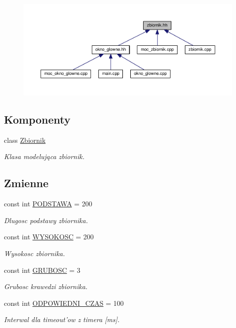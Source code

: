 \nopagebreak
\begin{figure}[H]
\begin{center}
\leavevmode
\includegraphics[width=350pt]{zbiornik_8hh__dep__incl}
\end{center}
\end{figure}
\subsection*{Komponenty}
\begin{DoxyCompactItemize}
\item 
class \hyperlink{class_zbiornik}{Zbiornik}
\begin{DoxyCompactList}\small\item\em Klasa modelująca zbiornik. \end{DoxyCompactList}\end{DoxyCompactItemize}
\subsection*{Zmienne}
\begin{DoxyCompactItemize}
\item 
const int \hyperlink{zbiornik_8hh_acd3c5814c051e565bf7854f6403acf49}{P\-O\-D\-S\-T\-A\-W\-A} = 200
\begin{DoxyCompactList}\small\item\em Dlugosc podstawy zbiornika. \end{DoxyCompactList}\item 
const int \hyperlink{zbiornik_8hh_a073767f0ac7dbf009a42b00de1092b52}{W\-Y\-S\-O\-K\-O\-S\-C} = 200
\begin{DoxyCompactList}\small\item\em Wysokosc zbiornika. \end{DoxyCompactList}\item 
const int \hyperlink{zbiornik_8hh_a359a95636f17b8e9b7a01389d75b521d}{G\-R\-U\-B\-O\-S\-C} = 3
\begin{DoxyCompactList}\small\item\em Grubosc krawedzi zbiornika. \end{DoxyCompactList}\item 
const int \hyperlink{zbiornik_8hh_a3a09b0fc9bed85242f7783147af182ae}{O\-D\-P\-O\-W\-I\-E\-D\-N\-I\-\_\-\-C\-Z\-A\-S} = 100
\begin{DoxyCompactList}\small\item\em Interwal dla timeout'ow z timera \mbox{[}ms\mbox{]}. \end{DoxyCompactList}\end{DoxyCompactItemize}


